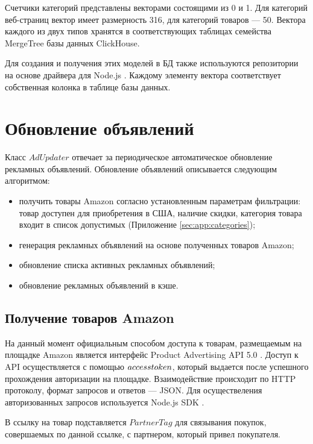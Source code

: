\documentclass[specification,annotation,times]{itmo-student-thesis}
\begin{document}
Счетчики категорий представлены векторами состоящими из 0 и 1. Для категорий веб-страниц вектор имеет размерность 316, для категорий товаров — 50. Вектора каждого из двух типов хранятся в соответствующих таблицах семейства MergeTree базы данных ClickHouse.

Для создания и получения этих моделей в БД также используются репозитории на основе драйвера для Node.js \cite{node-clickhouse}.  Каждому элементу вектора соответствует собственная колонка в таблице базы данных.




\section{Обновление объявлений}

Класс $AdUpdater$ отвечает за периодическое автоматическое обновление рекламных объявлений. Обновление объявлений описывается следующим алгоритмом:
\begin{itemize}
\item получить товары Amazon согласно установленным параметрам фильтрации: товар доступен для приобретения в США, наличие скидки, категория товара входит в список допустимых (Приложение \ref{sec:app:categories});
\item генерация рекламных объявлений на основе полученных товаров Amazon;
\item обновление списка активных рекламных объявлений;
\item обновление рекламных объявлений в кэше.
\end{itemize}

\subsection{Получение товаров Amazon}

На данный момент официальным способом доступа к товарам, размещаемым на площадке Amazon является интерфейс Product Advertising API 5.0 \cite{amazon-paapi-docs}. Доступ к API осуществляется с помощью $access\-token$, который выдается после успешного прохождения авторизации на площадке. Взаимодействие происходит по HTTP протоколу, формат запросов и ответов — JSON. Для осуществеления авторизованных запросов используется Node.js SDK \cite{amazon-paapi-sdk}.

В ссылку на товар подставляется $PartnerTag$ для связывания покупок, совершаемых по данной ссылке, с партнером, который привел покупателя.

\end{document}
